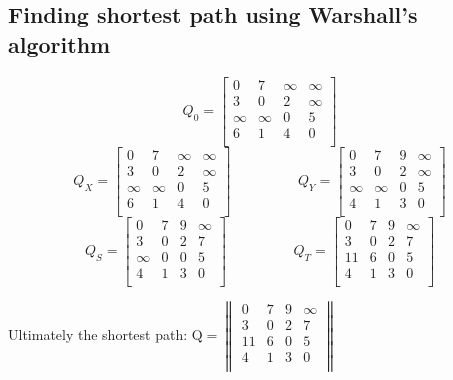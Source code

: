 \documentclass[11 pt]{article}
\begin{document}
\subsection{Finding shortest path using Warshall's algorithm}
$$
Q_0=
\begin{bmatrix}
	0 & 7 & \infty & \infty \\
	3 & 0 & 2 & \infty \\
	\infty & \infty & 0 & 5 \\
	6 & 1 & 4 & 0 \\
\end{bmatrix}
$$
\vspace{0.5cm}
$$
Q_X=
\begin{bmatrix}
0 & 7 & \infty & \infty \\
3 & 0 & 2 & \infty \\
\infty & \infty & 0 & 5 \\
6 & 1 & 4 & 0 \\
\end{bmatrix}
\hspace{2cm}
Q_Y=
\begin{bmatrix}
0 & 7 & 9 & \infty \\
3 & 0 & 2 & \infty \\
\infty & \infty & 0 & 5 \\
4 & 1 & 3 & 0 \\
\end{bmatrix}
$$
\vspace{0.5cm}
$$
Q_S=
\begin{bmatrix}
0 & 7 & 9 & \infty \\
3 & 0 & 2 & 7 \\
\infty & 0 & 0 & 5 \\
4 & 1 & 3 & 0 \\
\end{bmatrix}
\hspace{2cm}
Q_T=
\begin{bmatrix}
0 & 7 & 9 & \infty \\
3 & 0 & 2 & 7 \\
11 & 6 & 0 & 5 \\
4 & 1 & 3 & 0 \\
\end{bmatrix}
$$

Ultimately the shortest path: 
$
\textrm{Q}=
\begin{Vmatrix}
0 & 7 & 9 & \infty \\
3 & 0 & 2 & 7 \\
11 & 6 & 0 & 5 \\
4 & 1 & 3 & 0 \\
\end{Vmatrix}
$

\pagebreak
\printindex
\end{document}
